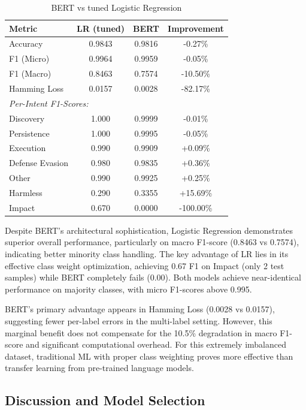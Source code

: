 \documentclass[acmlarge,screen,nonacm]{acmart}
\begin{document}
\begin{table}[htbp]
\centering
\caption{BERT vs tuned Logistic Regression}
\label{tab:model_comparison}
\begin{tabular}{@{}lccc@{}}
\toprule
\textbf{Metric} & \textbf{LR (tuned)} & \textbf{BERT} & \textbf{Improvement} \\
\midrule
Accuracy & 0.9843 & 0.9816 & -0.27\% \\
F1 (Micro) & 0.9964 & 0.9959 & -0.05\% \\
F1 (Macro) & 0.8463 & 0.7574 & -10.50\% \\
Hamming Loss & 0.0157 & 0.0028 & -82.17\% \\
\midrule
\multicolumn{4}{l}{\textit{Per-Intent F1-Scores:}} \\
Discovery & 1.000 & 0.9999 & -0.01\% \\
Persistence & 1.000 & 0.9995 & -0.05\% \\
Execution & 0.990 & 0.9909 & +0.09\% \\
Defense Evasion & 0.980 & 0.9835 & +0.36\% \\
Other & 0.990 & 0.9925 & +0.25\% \\
Harmless & 0.290 & 0.3355 & +15.69\% \\
Impact & 0.670 & 0.0000 & -100.00\% \\
\bottomrule
\end{tabular}
\end{table}


Despite BERT's architectural sophistication, Logistic Regression demonstrates superior overall performance, particularly on macro F1-score (0.8463 vs 0.7574), indicating better minority class handling. The key advantage of LR lies in its effective class weight optimization, achieving 0.67 F1 on Impact (only 2 test samples) while BERT completely fails (0.00). Both models achieve near-identical performance on majority classes, with micro F1-scores above 0.995.

BERT's primary advantage appears in Hamming Loss (0.0028 vs 0.0157), suggesting fewer per-label errors in the multi-label setting. However, this marginal benefit does not compensate for the 10.5\% degradation in macro F1-score and significant computational overhead. For this extremely imbalanced dataset, traditional ML with proper class weighting proves more effective than transfer learning from pre-trained language models.

\subsection{Discussion and Model Selection}
\end{document}
